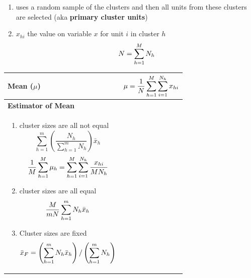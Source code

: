 \begin{enumerate}
    \item uses a random sample of the clusters and then all units from these clusters are selected (aka \textbf{primary cluster units})

    \item $x_{hi}$ the value on variable $x$ for unit $i$ in cluster $h$
    \[
        N = \displaystyle\sum_{h=1}^{M} N_h
    \]

    
\end{enumerate}

\begin{longtable}{|p{5cm}|p{9cm}|}
    \hline\endfirsthead
    \hline\endhead
    \hline\endfoot
    \hline\endlastfoot

    \textbf{Mean ($\mu$)} & $
        \mu = \dfrac{1}{N}
        \displaystyle\sum_{h=1}^{M}
        \displaystyle\sum_{i=1}^{N_h}
        x_{hi}
    $\\[1ex]
    \hline

    \textbf{Estimator of Mean} & \begin{minipage}{8cm}
        \vspace{0.1cm}
        $
            \bar{x}_h = \mu_h
            \quad\quad
            \bar{x} = \dfrac{1}{m}
            \dsum_{h=1}^{m} \bar{x}_h
        $\\
        \begin{enumerate}
            \item cluster sizes are all not equal
            \[
                \displaystyle
                \sum_{h=1}^{m}
                \left(
                    \frac{N_h}{
                        \sum_{h=1}^{m} N_h
                    }
                \right)\bar{x}_h
            \]
            \[
                \dfrac{1}{M}\displaystyle\sum_{h=1}^{M}\mu_h
                =
                \displaystyle\sum_{h=1}^{M}
                \displaystyle\sum_{i=1}^{N_h}
                \dfrac{x_{hi}}{MN_h}
            \]

            \item cluster sizes are all equal
            \[
                \dfrac{M}{mN}
                \displaystyle\sum_{h=1}^{m} N_h\bar{x}_h
            \]

            \item Cluster sizes are fixed
            \[
                \bar{x}_F =
                \left( 
                    \displaystyle\sum_{h=1}^{m} N_h\bar{x}_h
                \right) / \left( 
                    \displaystyle\sum_{h=1}^{m} N_h
                \right)
            \]


\end{enumerate}
\end{minipage}
\end{longtable}
